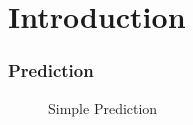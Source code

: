 \section{Introduction}

\begin{frame}
	\frametitle{Prediction}
	
\begin{minipage}{0.45\textwidth}
\begin{figure}
\centering

\caption{Simple Prediction}
\end{figure}
\end{minipage}
\begin{minipage}{0.45\textwidth}
\end{minipage}

\end{frame}

